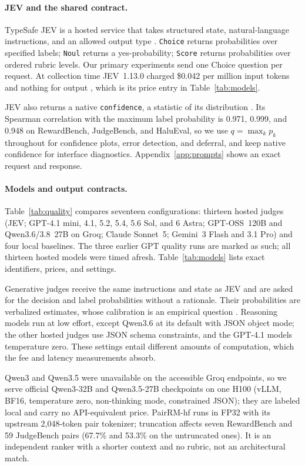 \documentclass[11pt]{article}
\begin{document}
\paragraph{JEV and the shared contract.}
TypeSafe JEV is a hosted service that takes structured state, natural-language instructions, and an allowed output type \citep{jevapi}. \texttt{Choice} returns probabilities over specified labels; \texttt{Noul} returns a yes-probability; \texttt{Score} returns probabilities over ordered rubric levels. Our primary experiments send one Choice question per request. At collection time JEV~1.13.0 charged \$0.042 per million input tokens and nothing for output \citep{jevmodels}, which is its price entry in Table~\ref{tab:models}.

JEV also returns a native \texttt{confidence}, a statistic of its distribution \citep{jevconfidence}. Its Spearman correlation with the maximum label probability is 0.971, 0.999, and 0.948 on RewardBench, JudgeBench, and HaluEval, so we use $q=\max_k p_k$ throughout for confidence plots, error detection, and deferral, and keep native confidence for interface diagnostics. Appendix~\ref{app:prompts} shows an exact request and response.
\paragraph{Models and output contracts.}
Table~\ref{tab:quality} compares seventeen configurations: thirteen hosted judges (JEV; GPT-4.1 mini, 4.1, 5.2, 5.4, 5.6 Sol, and 6 Astra; GPT-OSS~120B and Qwen3.6/3.8~27B on Groq; Claude Sonnet~5; Gemini~3 Flash and 3.1 Pro) and four local baselines. The three earlier GPT quality runs are marked as such; all thirteen hosted models were timed afresh. Table~\ref{tab:models} lists exact identifiers, prices, and settings.

Generative judges receive the same instructions and state as JEV and are asked for the decision and label probabilities without a rationale. Their probabilities are verbalized estimates, whose calibration is an empirical question \citep{elicitation,verbalized}. Reasoning models run at low effort, except Qwen3.6 at its default with JSON object mode; the other hosted judges use JSON schema constraints, and the GPT-4.1 models temperature zero. These settings entail different amounts of computation, which the fee and latency measurements absorb.

Qwen3 and Qwen3.5 were unavailable on the accessible Groq endpoints, so we serve official Qwen3-32B and Qwen3.5-27B checkpoints on one H100 (vLLM, BF16, temperature zero, non-thinking mode, constrained JSON); they are labeled local and carry no API-equivalent price. PairRM-hf runs in FP32 with its upstream 2,048-token pair tokenizer; truncation affects seven RewardBench and 59 JudgeBench pairs (67.7\% and 53.3\% on the untruncated ones). It is an independent ranker with a shorter context and no rubric, not an architectural match.
\end{document}
